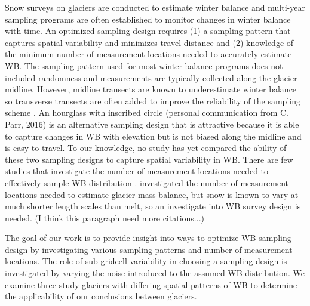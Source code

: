 \documentclass[twocolumn,letterpaper]{igs}
\begin{document}
Snow surveys on glaciers are conducted to estimate winter balance and multi-year sampling programs are often established to monitor changes in winter balance with time. An optimized sampling design requires (1) a sampling pattern that captures spatial variability and minimizes travel distance and (2) knowledge of the minimum number of measurement locations needed to accurately estimate WB. The sampling pattern used for most winter balance programs does not included randomness and measurements are typically collected along the glacier midline. However, midline transects are known to underestimate winter balance so transverse transects are often added to improve the reliability of the sampling scheme \citep[e.g.][]{Walmsley2015}. An hourglass with inscribed circle (personal communication from C. Parr, 2016) is an alternative sampling design that is attractive because it is able to capture changes in WB with elevation but is not biased along the midline and is easy to travel. To our knowledge, no study has yet compared the ability of these two sampling designs to capture spatial variability in WB. There are few studies that investigate the number of measurement locations needed to effectively sample WB distribution \citep[c.f.][]{Walmsley2015}. \cite{Fountain1999} investigated the number of measurement locations needed to estimate glacier mass balance, but snow is known to vary at much shorter length scales than melt, so an investigate into WB survey design is needed. (I think this paragraph need more citations...)

The goal of our work is to provide insight into ways to optimize WB sampling design by investigating various sampling patterns and number of measurement locations. The role of sub-gridcell variability in choosing a sampling design is investigated by varying the noise introduced to the assumed WB distribution. We examine three study glaciers with differing spatial patterns of WB to determine the applicability of our conclusions between glaciers. 
\end{document}

